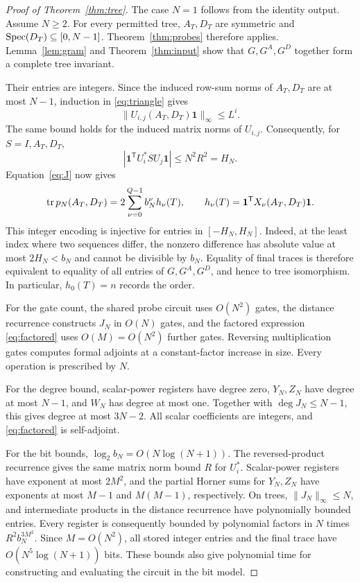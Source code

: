 \documentclass[11pt,letterpaper]{article}
\theoremstyle{definition}\newtheorem{definition}[theorem]{Definition}
\theoremstyle{remark}\newtheorem{remark}[theorem]{Remark}
\newcommand{\one}{\mathbf1}\newcommand{\M}{\mathcal M}
\begin{document}
\begin{proof}[Proof of Theorem~\ref{thm:tree}]
The case $N=1$ follows from the identity output. Assume $N\ge2$.
For every permitted tree, $A_T,D_T$ are symmetric and
$\operatorname{Spec}(D_T)\subseteq[0,N-1]$. Theorem~\ref{thm:probes} therefore applies.
Lemma~\ref{lem:gram} and Theorem~\ref{thm:input} show that $G,G^A,G^D$ together
form a complete tree invariant.

Their entries are integers. Since the induced row-sum norms of $A_T,D_T$ are
at most $N-1$, induction in \eqref{eq:triangle} gives
\[
\|U_{i,j}(A_T,D_T)\one\|_\infty\le L^i.
\]
The same bound holds for the induced matrix norms of $U_{i,j}$.
Consequently, for $S=I,A_T,D_T$,
\[
|\one^{\mathsf T}U_i^*SU_j\one|\le N^2R^2=H_N.
\]
Equation~\eqref{eq:J} now gives
\[
\tr p_N(A_T,D_T)=2\sum_{\nu=0}^{Q-1}b_N^\nu h_\nu(T),
\qquad h_\nu(T)=\one^{\mathsf T}X_\nu(A_T,D_T)\one.
\]
This integer encoding is injective for entries in $[-H_N,H_N]$.
Indeed, at the least index where two sequences differ, the nonzero difference
has absolute value at most $2H_N<b_N$ and cannot be divisible by $b_N$.
Equality of final traces is therefore equivalent to equality of all entries
of $G,G^A,G^D$, and hence to tree isomorphism. In particular, $h_0(T)=n$
records the order.

For the gate count, the shared probe circuit uses $O(N^2)$ gates, the distance
recurrence constructs $J_N$ in $O(N)$ gates, and the factored expression
\eqref{eq:factored} uses $O(M)=O(N^2)$ further gates. Reversing multiplication
gates computes formal adjoints at a constant-factor increase in size.
Every operation is prescribed by $N$.

For the degree bound, scalar-power registers have degree zero,
$Y_N,Z_N$ have degree at most $N-1$, and $W_N$ has degree at most one.
Together with $\deg J_N\le N-1$, this gives degree at most $3N-2$.
All scalar coefficients are integers, and \eqref{eq:factored} is self-adjoint.

For the bit bounds, $\log_2 b_N=O(N\log(N+1))$. The reversed-product recurrence
gives the same matrix norm bound $R$ for $U_i^*$. Scalar-power registers have
exponent at most $2M^2$, and the partial Horner sums for $Y_N,Z_N$ have
exponents at most $M-1$ and $M(M-1)$, respectively. On trees,
$\|J_N\|_\infty\le N$, and intermediate products in the distance recurrence
have polynomially bounded entries. Every register is consequently bounded by
polynomial factors in $N$ times $R^2b_N^{3M^2}$. Since $M=O(N^2)$, all stored
integer entries and the final trace have $O(N^5\log(N+1))$ bits.
These bounds also give polynomial time for constructing and evaluating the
circuit in the bit model.
\end{proof}
\end{document}
